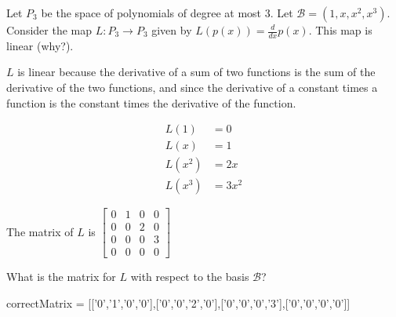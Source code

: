 \documentclass{ximera}
\begin{document}
\begin{problem}
	Let $P_3$ be the space of polynomials of degree at most $3$.  Let $\mathcal{B} = (1,x,x^2,x^3)$.  Consider the map $L:P_3 \to P_3$ given by 
	$L(p(x)) = \frac{d}{dx} p(x)$. This map is linear (why?).  
	\begin{solution}
		\begin{hint}
			$L$ is linear because the derivative of a sum of two functions is the sum of the derivative of the two functions, and since the derivative of a constant
			times a function is the constant times the derivative of the function.
		\end{hint}
		\begin{hint}
			\begin{align*}
				L(1) &=0\\
				L(x) &=1\\
				L(x^2)&=2x\\
				L(x^3)&=3x^2
			\end{align*}
		\end{hint}
		\begin{hint}
			The matrix of $L$ is \(\begin{bmatrix} 0&1&0&0\\0&0&2&0\\0&0&0&3\\0&0&0&0\end{bmatrix}\)
		\end{hint}
	What is the matrix for $L$ with respect to the basis $\mathcal{B}$?
	\begin{matrix-answer}
		correctMatrix = [['0','1','0','0'],['0','0','2','0'],['0','0','0','3'],['0','0','0','0']]
	\end{matrix-answer}
	\end{solution}
\end{problem}
\end{document}
